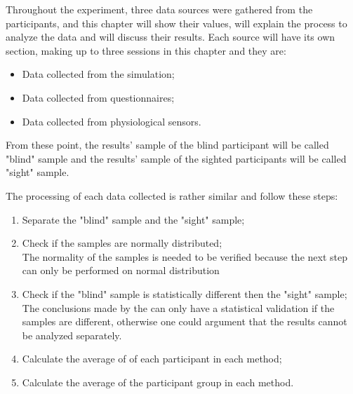 


Throughout the experiment, three data sources were gathered from the participants, and this chapter will show their values, will explain the process to analyze the data and will discuss their results. Each source will have its own section, making up to three sessions in this chapter and they are:

\begin{itemize}
    \item Data collected from the simulation;
    \item Data collected from questionnaires;
    \item Data collected from physiological sensors.
\end{itemize}

From these point, the results' sample of the blind participant will be called "blind" sample and the results' sample of the sighted participants will be called "sight" sample.

The processing of each data collected is rather similar and follow these steps:
\begin{enumerate}
    \item Separate the "blind" sample and the "sight" sample;
    \item Check if the samples are normally distributed; \label{itm:results_shapiro} \\
        The normality of the samples is needed to be verified because the next step can only be performed on normal distribution
    \item Check if the "blind" sample is statistically different then the "sight" sample; \label{itm:results_t_test} \\ 
        The conclusions made by the can only have a statistical validation if the samples are different, otherwise one could argument that the results cannot be analyzed separately.
    \item Calculate the average of of each participant in each method; \label{itm:results_average_method_particpant}
    \item Calculate the average of the participant group in each method. \label{itm:results_average_method}
\end{enumerate}

